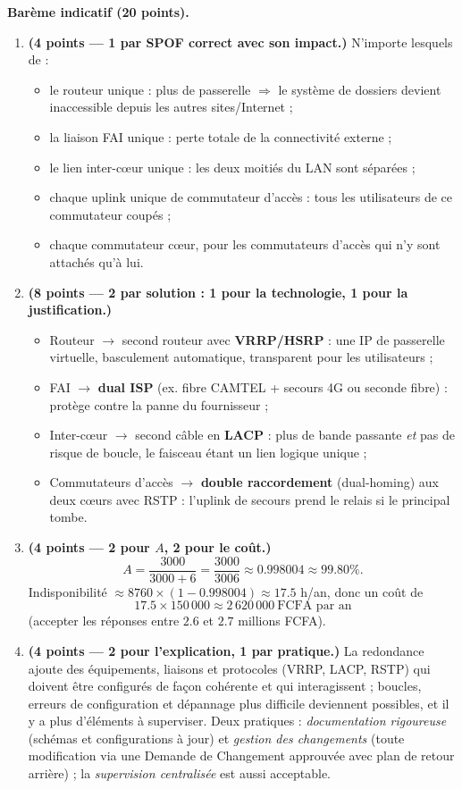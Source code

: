 \documentclass[11pt]{article}
\begin{document}
\begin{corrige}
\textbf{Barème indicatif (20 points).}
\begin{enumerate}
\item \textbf{(4 points --- 1 par SPOF correct avec son impact.)} N'importe lesquels de :
\begin{itemize}
\item le routeur unique : plus de passerelle $\Rightarrow$ le système de dossiers devient inaccessible depuis les autres sites/Internet ;
\item la liaison FAI unique : perte totale de la connectivité externe ;
\item le lien inter-cœur unique : les deux moitiés du LAN sont séparées ;
\item chaque uplink unique de commutateur d'accès : tous les utilisateurs de ce commutateur coupés ;
\item chaque commutateur cœur, pour les commutateurs d'accès qui n'y sont attachés qu'à lui.
\end{itemize}
\item \textbf{(8 points --- 2 par solution : 1 pour la technologie, 1 pour la justification.)}
\begin{itemize}
\item Routeur $\rightarrow$ second routeur avec \textbf{VRRP/HSRP} : une IP de passerelle virtuelle, basculement automatique, transparent pour les utilisateurs ;
\item FAI $\rightarrow$ \textbf{dual ISP} (ex. fibre CAMTEL + secours 4G ou seconde fibre) : protège contre la panne du fournisseur ;
\item Inter-cœur $\rightarrow$ second câble en \textbf{LACP} : plus de bande passante \emph{et} pas de risque de boucle, le faisceau étant un lien logique unique ;
\item Commutateurs d'accès $\rightarrow$ \textbf{double raccordement} (dual-homing) aux deux cœurs avec RSTP : l'uplink de secours prend le relais si le principal tombe.
\end{itemize}
\item \textbf{(4 points --- 2 pour $A$, 2 pour le coût.)}
\[ A = \frac{3000}{3000+6} = \frac{3000}{3006} \approx 0.998004 \approx 99.80\%. \]
Indisponibilité $\approx 8760 \times (1 - 0.998004) \approx 17.5$ h/an, donc un coût de
\[ 17.5 \times 150\,000 \approx 2\,620\,000\ \text{FCFA par an} \]
(accepter les réponses entre $2.6$ et $2.7$ millions FCFA).
\item \textbf{(4 points --- 2 pour l'explication, 1 par pratique.)} La redondance ajoute des équipements, liaisons et protocoles (VRRP, LACP, RSTP) qui doivent être configurés de façon cohérente et qui interagissent ; boucles, erreurs de configuration et dépannage plus difficile deviennent possibles, et il y a plus d'éléments à superviser. Deux pratiques : \emph{documentation rigoureuse} (schémas et configurations à jour) et \emph{gestion des changements} (toute modification via une Demande de Changement approuvée avec plan de retour arrière) ; la \emph{supervision centralisée} est aussi acceptable.

\end{enumerate}
\end{corrige}
\end{document}
